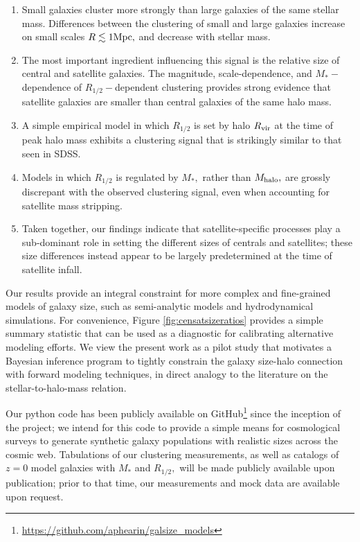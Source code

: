 \documentclass[usenatbib,usegraphicx,letterpaper]{mn2e}
\newcommand{\ben}{\begin{enumerate}}
\newcommand{\een}{\end{enumerate}}
\newcommand{\rhalf}{R_{1/2}}
\newcommand{\mstar}{M_{\ast}}
\newcommand{\mhalo}{M_{\rm halo}}
\newcommand{\rvir}{R_{\rm vir}}
\newcommand{\mpc}{{\rm Mpc}}
\begin{document}
\ben
\item Small galaxies cluster more strongly than large galaxies of the same stellar mass. Differences between the clustering of small and large galaxies increase on small scales $R\lesssim1\mpc,$ and decrease with stellar mass.
\item The most important ingredient influencing this signal is the relative size of central and satellite galaxies. The magnitude, scale-dependence, and $\mstar-$dependence of $\rhalf-$dependent clustering provides strong evidence that satellite galaxies are smaller than central galaxies of the same halo mass.
\item A simple empirical model in which $\rhalf$ is set by halo $\rvir$ at the time of peak halo mass exhibits a clustering signal that is strikingly similar to that seen in SDSS.
\item Models in which $\rhalf$ is regulated by $\mstar,$ rather than $\mhalo,$ are grossly discrepant with the observed clustering signal, even when accounting for satellite mass stripping.
\item Taken together, our findings indicate that satellite-specific processes play a sub-dominant role in setting the different sizes of centrals and satellites; these size differences instead appear to be largely predetermined at the time of satellite infall.
\een

Our results provide an integral constraint for more complex and fine-grained models of galaxy size, such as semi-analytic models and hydrodynamical simulations. For convenience, Figure \ref{fig:censatsizeratios} provides a simple summary statistic that can be used as a diagnostic for calibrating alternative modeling efforts. We view the present work as a pilot study that motivates a Bayesian inference program to tightly constrain the galaxy size-halo connection with forward modeling techniques, in direct analogy to the literature on the stellar-to-halo-mass relation.

Our python code has been publicly available on GitHub\footnote{\url{https://github.com/aphearin/galsize_models}} since the inception of the project; we intend for this code to provide a simple means for cosmological surveys to generate synthetic galaxy populations with realistic sizes across the cosmic web. Tabulations of our clustering measurements, as well as catalogs of $z=0$ model galaxies with $\mstar$ and $\rhalf,$ will be made publicly available upon publication; prior to that time, our measurements and mock data are available upon request. 
\end{document}
